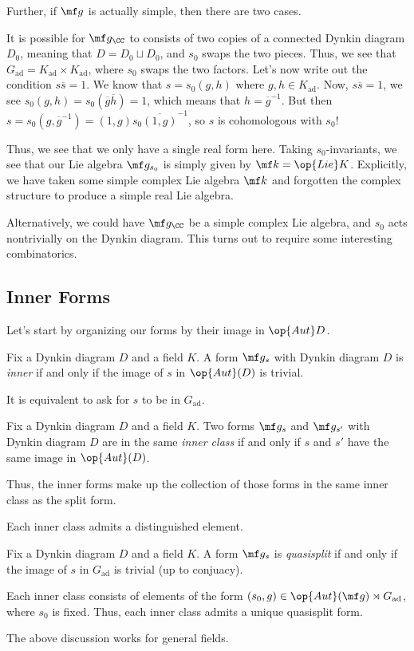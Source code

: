 \documentclass[../notes.tex]{subfiles}
\begin{document}
Further, if $\mf g$ is actually simple, then there are two cases.
\begin{example}
	It is possible for $\mf g_\CC$ to consists of two copies of a connected Dynkin diagram $D_0$, meaning that $D=D_0\sqcup D_0$, and $s_0$ swaps the two pieces. Thus, we see that $G_{\mathrm{ad}}=K_{\mathrm{ad}}\times K_{\mathrm{ad}}$, where $s_0$ swaps the two factors. Let's now write out the condition $s\overline s=1$. We know that $s=s_0(g,h)$ where $g,h\in K_{\mathrm{ad}}$. Now, $s\overline s=1$, we see $s_0(g,h)=s_0(\overline g\overline h)=1$, which means that $h=\overline g^{-1}$. But then $s=s_0\left(g,\overline g^{-1}\right)=(1,g)s_0\overline{(1,g)}^{-1}$, so $s$ is cohomologous with $s_0$!

	Thus, we see that we only have a single real form here. Taking $s_0$-invariants, we see that our Lie algebra $\mf g_{s_0}$ is simply given by $\mf k=\op{Lie}K$. Explicitly, we have taken some simple complex Lie algebra $\mf k$ and forgotten the complex structure to produce a simple real Lie algebra.
\end{example}
Alternatively, we could have $\mf g_\CC$ be a simple complex Lie algebra, and $s_0$ acts nontrivially on the Dynkin diagram. This turns out to require some interesting combinatorics.

\subsection{Inner Forms}
Let's start by organizing our forms by their image in $\op{Aut}D$.
\begin{definition}
	Fix a Dynkin diagram $D$ and a field $K$. A form $\mf g_s$ with Dynkin diagram $D$ is \textit{inner} if and only if the image of $s$ in $\op{Aut}(D)$ is trivial.
\end{definition}
\begin{remark}
	It is equivalent to ask for $s$ to be in $G_{\mathrm{ad}}$.
\end{remark}
\begin{definition}
	Fix a Dynkin diagram $D$ and a field $K$. Two forms $\mf g_s$ and $\mf g_{s'}$ with Dynkin diagram $D$ are in the same \textit{inner class} if and only if $s$ and $s'$ have the same image in $\op{Aut}(D)$.
\end{definition}
\begin{remark}
	Thus, the inner forms make up the collection of those forms in the same inner class as the split form.
\end{remark}
Each inner class admits a distinguished element.
\begin{definition}[quasisplit]
	Fix a Dynkin diagram $D$ and a field $K$. A form $\mf g_s$ is \textit{quasisplit} if and only if the image of $s$ in $G_{\mathrm{ad}}$ is trivial (up to conjuacy).
\end{definition}
\begin{remark}
	Each inner class consists of elements of the form $(s_0,g)\in \op{Aut}(\mf g)\rtimes G_{\mathrm{ad}}$, where $s_0$ is fixed. Thus, each inner class admits a unique quasisplit form.
\end{remark}
The above discussion works for general fields.
\end{document}
